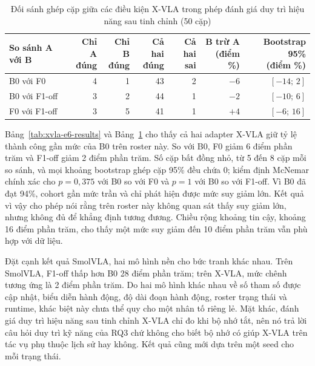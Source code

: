\begin{table}[htbp]
\centering\small
\caption{Đối sánh ghép cặp giữa các điều kiện X-VLA trong phép đánh giá duy trì hiệu năng sau tinh chỉnh (50 cặp)}
\label{tab:xvla-e6-paired}
\setlength{\tabcolsep}{4pt}
\begin{tabular}{lrrrrrr}
\toprule
\textbf{So sánh A với B} & \shortstack{\textbf{Chỉ A}\\\textbf{đúng}} & \shortstack{\textbf{Chỉ B}\\\textbf{đúng}} & \shortstack{\textbf{Cả hai}\\\textbf{đúng}} & \shortstack{\textbf{Cả hai}\\\textbf{sai}} & \shortstack{\textbf{B trừ A}\\\textbf{(điểm \%)}} & \shortstack{\textbf{Bootstrap 95\%}\\\textbf{(điểm \%)}} \\
\midrule
B0 với F0     & 4 & 1 & 43 & 2 & $-6$ & $[-14;\,2]$ \\
B0 với F1-off & 3 & 2 & 44 & 1 & $-2$ & $[-10;\,6]$ \\
F0 với F1-off & 3 & 5 & 41 & 1 & $+4$ & $[-6;\,16]$ \\
\bottomrule
\end{tabular}
\end{table}

Bảng~\ref{tab:xvla-e6-results} và Bảng~\ref{tab:xvla-e6-paired} cho thấy cả hai adapter X-VLA giữ tỷ lệ thành công gần mức của B0 trên roster này. So với B0, F0 giảm 6 điểm phần trăm và F1-off giảm 2 điểm phần trăm. Số cặp bất đồng nhỏ, từ 5 đến 8 cặp mỗi so sánh, và mọi khoảng bootstrap ghép cặp 95\% đều chứa 0; kiểm định McNemar chính xác cho $p = 0{,}375$ với B0 so với F0 và $p = 1$ với B0 so với F1-off. Vì B0 đã đạt 94\%, cohort gần mức trần và chỉ phát hiện được mức suy giảm lớn. Kết quả vì vậy cho phép nói rằng trên roster này không quan sát thấy suy giảm lớn, nhưng không đủ để khẳng định tương đương. Chiều rộng khoảng tin cậy, khoảng 16 điểm phần trăm, cho thấy một mức suy giảm đến 10 điểm phần trăm vẫn phù hợp với dữ liệu.

Đặt cạnh kết quả SmolVLA, hai mô hình nền cho bức tranh khác nhau. Trên SmolVLA, F1-off thấp hơn B0 28 điểm phần trăm; trên X-VLA, mức chênh tương ứng là 2 điểm phần trăm. Do hai mô hình khác nhau về số tham số được cập nhật, biểu diễn hành động, độ dài đoạn hành động, roster trạng thái và runtime, khác biệt này chưa thể quy cho một nhân tố riêng lẻ. Mặt khác, đánh giá duy trì hiệu năng sau tinh chỉnh X-VLA chỉ đo khi bộ nhớ tắt, nên nó trả lời câu hỏi duy trì kỹ năng của RQ3 chứ không cho biết bộ nhớ có giúp X-VLA trên tác vụ phụ thuộc lịch sử hay không. Kết quả cũng mới dựa trên một seed cho mỗi trạng thái.

